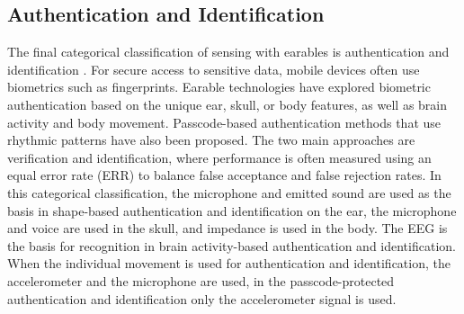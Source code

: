 \subsection{Authentication and Identification}
\label{Background:SensingWithEarables:Authentication}
The final categorical classification of sensing with earables is authentication and identification \cite{roddigerSensingEarablesSystematic2022a}. 
For secure access to sensitive data, mobile devices often use biometrics such as fingerprints. 
Earable technologies have explored biometric authentication based on the unique ear, skull, or body features, as well as brain activity and body movement. 
Passcode-based authentication methods that use rhythmic patterns have also been proposed. 
The two main approaches are verification and identification, where performance is often measured using an equal error rate (ERR) to balance false acceptance and false rejection rates.
In this categorical classification, the microphone and emitted sound are used as the basis in shape-based authentication and identification on the ear, the microphone and voice are used in the skull, and impedance is used in the body.
The EEG is the basis for recognition in brain activity-based authentication and identification.
When the individual movement is used for authentication and identification, the accelerometer and the microphone are used, in the passcode-protected authentication and identification only the accelerometer signal is used.

